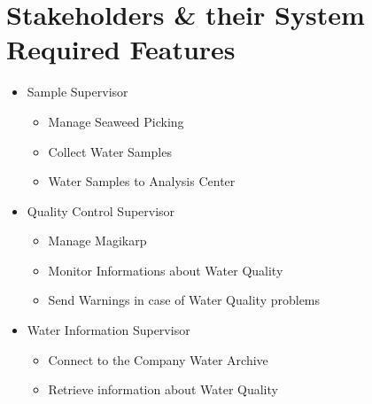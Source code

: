 \newpage \chapter{\textbf{Stakeholders \& their System Required Features}}
\begin{itemize}

\item{Sample Supervisor}

\begin{itemize}
\item{Manage Seaweed Picking}
\item{Collect Water Samples}
\item{Water Samples to Analysis Center}
\end{itemize}

\item{Quality Control Supervisor}

\begin{itemize}
\item{Manage Magikarp}
\item{Monitor Informations about Water Quality}
\item{Send Warnings in case of Water Quality problems}
\end{itemize}

\item{Water Information Supervisor}

\begin{itemize}
\item{Connect to the Company Water Archive}
\item{Retrieve information about Water Quality}
\end{itemize}

\end{itemize}
